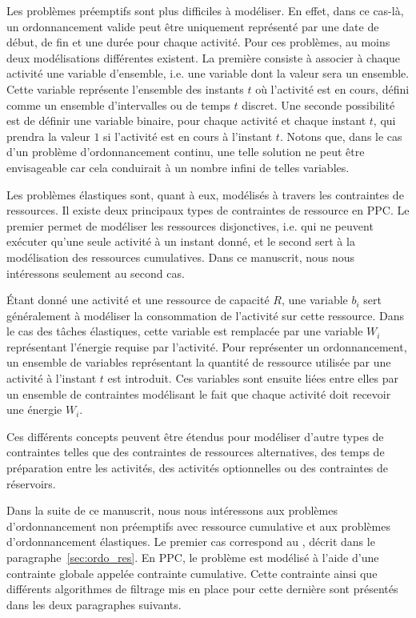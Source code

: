 Les problèmes préemptifs sont plus difficiles à modéliser. En effet,
dans ce cas-là, un ordonnancement valide peut être uniquement 
représenté par une date de début, de fin et une durée pour chaque
activité. Pour ces problèmes, au moins deux modélisations différentes
existent. La première consiste à associer à chaque activité une
variable d'ensemble, i.e. une variable dont la valeur sera un
ensemble. Cette variable représente l'ensemble des instants $t$ où
l'activité est en cours, défini comme un ensemble d'intervalles ou de
temps $t$ discret. Une seconde possibilité est de définir une variable
binaire, pour chaque activité et chaque instant $t$, qui prendra la
valeur $1$ si l'activité est en cours à l'instant $t$. Notons que,
dans le cas d'un problème d'ordonnancement continu, une telle solution
ne peut être envisageable car cela conduirait à un nombre infini de
telles variables.

Les problèmes élastiques sont, quant à eux, modélisés à travers les
contraintes de ressources. Il existe deux principaux types de
contraintes de ressource en PPC. Le premier permet de modéliser les
ressources disjonctives, i.e. qui ne peuvent exécuter qu'une seule
activité à un instant donné, et le second sert à la modélisation des
ressources cumulatives. Dans ce manuscrit, nous nous intéressons
seulement au second cas.

{\'E}tant donné une activité et une ressource de capacité $R$, une
variable $b_i$ sert généralement à modéliser la consommation de
l'activité sur cette ressource. Dans le cas des tâches élastiques,
cette variable est remplacée par une variable $W_i$ représentant
l'énergie requise par l'activité. Pour représenter un ordonnancement,
un ensemble de variables représentant la quantité de ressource
utilisée par une activité à l'instant $t$ est introduit. Ces variables
sont ensuite liées entre elles par un ensemble de contraintes
modélisant le fait que chaque activité doit recevoir une énergie
$W_i$. 

Ces différents concepts peuvent être étendus pour modéliser d'autre
types de contraintes telles que des contraintes de ressources
alternatives, des temps de préparation entre les activités, des
activités optionnelles ou des contraintes de réservoirs.

Dans la suite de ce manuscrit, nous nous intéressons aux problèmes
d'ordonnancement non préemptifs avec ressource cumulative et aux
problèmes d'ordonnancement élastiques. Le premier cas correspond au
\CUSP, décrit dans le paragraphe~\ref{sec:ordo_res}. En PPC, le
problème est modélisé à l'aide d'une contrainte globale appelée
contrainte cumulative. Cette contrainte ainsi que différents
algorithmes de filtrage mis en place pour cette dernière sont
présentés dans les deux paragraphes suivants. 

